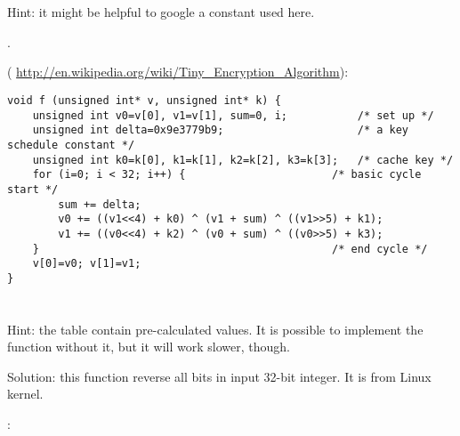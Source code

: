 \section{}

{Hint: it might be helpful to google a constant used here.}

.

 ( \url{http://en.wikipedia.org/wiki/Tiny_Encryption_Algorithm}):

\begin{lstlisting}
void f (unsigned int* v, unsigned int* k) {
    unsigned int v0=v[0], v1=v[1], sum=0, i;           /* set up */
    unsigned int delta=0x9e3779b9;                     /* a key schedule constant */
    unsigned int k0=k[0], k1=k[1], k2=k[2], k3=k[3];   /* cache key */
    for (i=0; i < 32; i++) {                       /* basic cycle start */
        sum += delta;
        v0 += ((v1<<4) + k0) ^ (v1 + sum) ^ ((v1>>5) + k1);
        v1 += ((v0<<4) + k2) ^ (v0 + sum) ^ ((v0>>5) + k3);  
    }                                              /* end cycle */
    v[0]=v0; v[1]=v1;
}
\end{lstlisting}

\section{}

{Hint: the table contain pre-calculated values.
It is possible to implement the function without it, but it will work slower, though.}

{Solution: this function reverse all bits in input 32-bit integer. 
It is  from Linux kernel.}

:

